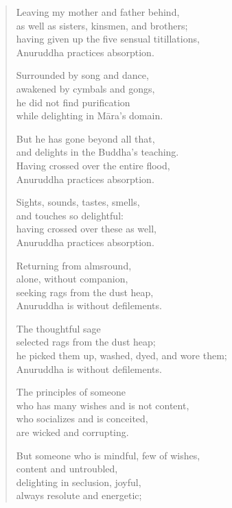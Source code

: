 \documentclass[12pt,openany]{book}%
\begin{document}
\begin{verse}%
Leaving my mother and father behind, \\
as well as sisters, kinsmen, and brothers; \\
having given up the five sensual titillations, \\
Anuruddha practices absorption. 

Surrounded by song and dance, \\
awakened by cymbals and gongs, \\
he did not find purification \\
while delighting in \textsanskrit{Māra}’s domain. 

But he has gone beyond all that, \\
and delights in the Buddha’s teaching. \\
Having crossed over the entire flood, \\
Anuruddha practices absorption. 

Sights, sounds, tastes, smells, \\
and touches so delightful: \\
having crossed over these as well, \\
Anuruddha practices absorption. 

Returning from almsround, \\
alone, without companion, \\
seeking rags from the dust heap, \\
Anuruddha is without defilements. 

The thoughtful sage \\
selected rags from the dust heap; \\
he picked them up, washed, dyed, and wore them; \\
Anuruddha is without defilements. 

The principles of someone \\
who has many wishes and is not content, \\
who socializes and is conceited, \\
are wicked and corrupting. 

But someone who is mindful, few of wishes, \\
content and untroubled, \\
delighting in seclusion, joyful, \\
always resolute and energetic; 


\end{verse}
\end{document}
